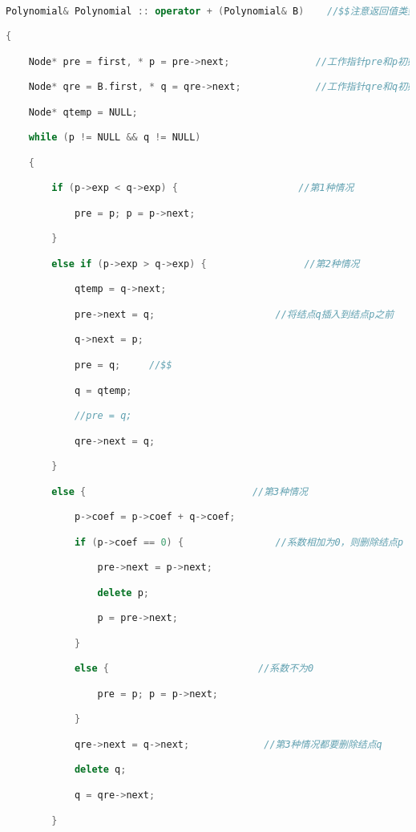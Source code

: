 \begin{lstlisting}[language=C++]
  

Polynomial& Polynomial :: operator + (Polynomial& B)    //$$注意返回值类型是引用类型

{

    Node* pre = first, * p = pre->next;               //工作指针pre和p初始化

    Node* qre = B.first, * q = qre->next;             //工作指针qre和q初始化

    Node* qtemp = NULL;

    while (p != NULL && q != NULL)

    {

        if (p->exp < q->exp) {                     //第1种情况

            pre = p; p = p->next;

        }

        else if (p->exp > q->exp) {                 //第2种情况

            qtemp = q->next;

            pre->next = q;                     //将结点q插入到结点p之前

            q->next = p;

            pre = q;     //$$

            q = qtemp;

            //pre = q;

            qre->next = q;

        }

        else {                             //第3种情况

            p->coef = p->coef + q->coef;

            if (p->coef == 0) {                //系数相加为0，则删除结点p

                pre->next = p->next;

                delete p;

                p = pre->next;

            }

            else {                          //系数不为0

                pre = p; p = p->next;

            }

            qre->next = q->next;             //第3种情况都要删除结点q

            delete q;

            q = qre->next;

        }


\end{lstlisting}
